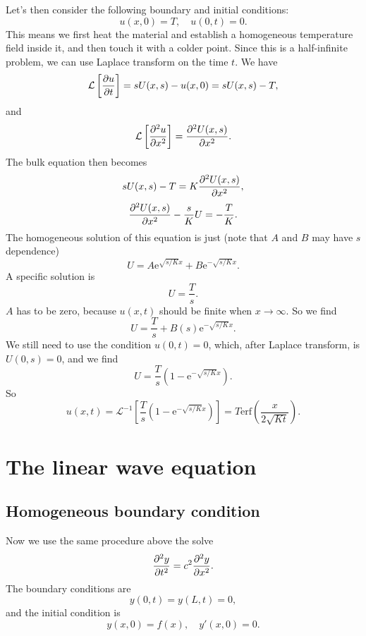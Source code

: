 \documentclass[hyperref, a4paper]{article}
\newcommand*{\ee}{\mathrm{e}}
\newcommand*{\laplace}{\mathcal{L}}
\begin{document}
Let's then consider the following boundary and initial conditions:
\begin{equation}
    u(x, 0) = T, \quad 
    u(0, t) = 0.
\end{equation}
This means we first heat the material 
and establish a homogeneous temperature field inside it, 
and then touch it with a colder point.
Since this is a half-infinite problem, 
we can use Laplace transform on the time $t$.
We have 
\[
    \laplace\left[\pdv{u}{t}\right]
    = s U(x, s) - u(x, 0) = s U(x, s) - T, 
\]
and 
\[
    \laplace\left[\pdv[2]{u}{x}\right] = \pdv[2]{U(x, s)}{x}.
\]
The bulk equation then becomes 
\[
    s U(x, s) - T = K \pdv[2]{U(x, s)}{x}, 
\]
\[
    \pdv[2]{U(x, s)}{x} - \frac{s}{K} U = - \frac{T}{K}.
\]
The homogeneous solution of this equation is just (note that $A$ and $B$ may have $s$ dependence)
\[
    U = A \ee^{\sqrt{s / K} x} + B \ee^{- \sqrt{s / K} x} .
\] 
A specific solution is 
\[
    U = \frac{T}{s}.
\]
$A$ has to be zero, 
because $u(x, t)$ should be finite when $x \to \infty$.
So we find 
\[
    U = \frac{T}{s} + B(s) \ee^{- \sqrt{s / K} x}.
\]
We still need to use the condition $u(0 , t) = 0$, 
which, after Laplace transform, is $U(0, s) = 0$,
and we find 
\[
    U = \frac{T}{s} (1 - \ee^{- \sqrt{s / K} x}).
\]
So 
\begin{equation}
    u(x, t) = \laplace^{-1} \left[
        \frac{T}{s} (1 - \ee^{- \sqrt{s / K} x})
    \right] = T \mathrm{erf} \left(
        \frac{x}{2 \sqrt{Kt}}
    \right).
\end{equation}

\section{The linear wave equation}

\subsection{Homogeneous boundary condition}

Now we use the same procedure above the solve 
\begin{equation}
    \pdv[2]{y}{t} = c^2 \pdv[2]{y}{x}.
\end{equation}
The boundary conditions are 
\begin{equation}
    y(0, t) = y(L, t) = 0, 
\end{equation}
and the initial condition is 
\begin{equation}
    y(x, 0) = f(x), \quad y'(x, 0) = 0.
\end{equation}
\end{document}
